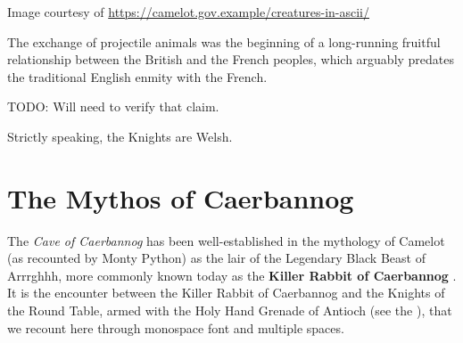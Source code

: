 \documentclass{metanorma}
\begin{document}



\begin{note}
  Image courtesy of \url{https://camelot.gov.example/creatures-in-ascii/}
\end{note}




The exchange of projectile animals was the beginning of a
long-running fruitful relationship between the British and the
French peoples, which
arguably predates the traditional English enmity with the
French.

\begin{reviewernote}
  TODO: Will need to verify that claim.
\end{reviewernote}

\begin{reviewernote}
  Strictly speaking, the Knights are Welsh.
\end{reviewernote}

\begin{comment}
This document, as it turns out, has a profusion of XML comments.

As expected, they are ignored in any rendering of the document.
\end{comment}



\section{The Mythos of Caerbannog}
\label{caerbannog}


The \textit{Cave of Caerbannog} has been well-established in the mythology
of Camelot (as recounted by Monty Python) as the lair of the
Legendary Black Beast of Arrrghhh, more commonly known today as the
\textbf{Killer Rabbit of Caerbannog} .
It is the encounter between the Killer Rabbit of Caerbannog and the
Knights of the Round Table, armed with the Holy Hand Grenade of
Antioch (see the ), that we
recount here through monospace font and multiple spaces.
\end{document}
